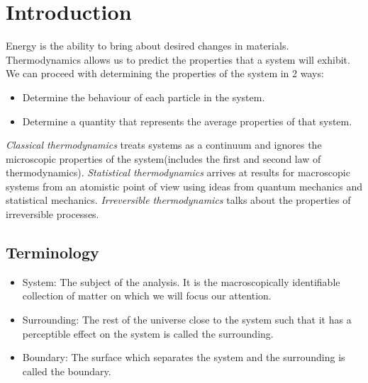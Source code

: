 \documentclass[12pt]{article}
\title{\sffamily{MM 209 Notes}}
\author{\sffamily{\color{blue}{Advait Risbud}}}
\date{May 21'}
\begin{document}
	\sffamily
	\maketitle
	\tableofcontents
	\pagebreak
\section{Introduction}
	Energy is the ability to bring about desired changes in materials. Thermodynamics allows us to predict the properties that a system will exhibit. We can proceed with determining the properties of the system in 2 ways:
	\begin{itemize}
		\item Determine the behaviour of each particle in the system.
		\item Determine a quantity that represents the average properties of that system.
	\end{itemize}
	\textit{Classical thermodynamics} treats systems as a continuum and ignores the microscopic properties of the system(includes the first and second law of thermodynamics). \textit{Statistical thermodynamics} arrives at results for macroscopic systems from an atomistic point of view using ideas from quantum mechanics and statistical mechanics. \textit{Irreversible thermodynamics} talks about the properties of irreversible processes. 
	
	\subsection{Terminology}
	\begin{itemize}
		\item System: The subject of the analysis. It is the macroscopically identifiable collection of matter on which we will focus our attention.
		\item Surrounding: The rest of the universe close to the system such that it has a perceptible effect on the system is called the surrounding.
		\item Boundary: The surface which separates the system and the surrounding is called the boundary.
	\end{itemize}
    
\end{document}
